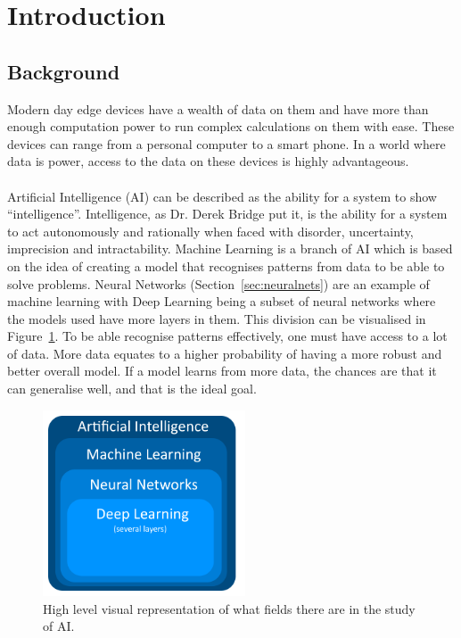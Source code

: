 \documentclass[12pt]{article}
\begin{document}
\listoffigures
{}
\clearpage

\listofalgorithms
{}
\clearpage

\listoftables
{}
\cleardoublepage


\setcounter{page}{1}





\section{Introduction}
\subsection{Background}
Modern day edge devices have a wealth of data on them and have more than enough computation power to run complex calculations on them with ease. These devices can range from a personal computer to a smart phone. In a world where data is power, access to the data on these devices is highly advantageous.
\\\\
Artificial Intelligence (AI) can be described as the ability for a system to show “intelligence”. Intelligence, as Dr. Derek Bridge put it, is the ability for a system to act autonomously and rationally when faced with disorder, uncertainty, imprecision and intractability. Machine Learning is a branch of AI which is based on the idea of creating a model that recognises patterns from data to be able to solve problems. Neural Networks (Section~\ref{sec:neuralnets}) are an example of machine learning with Deep Learning being a subset of neural networks where the models used have more layers in them. This division can be visualised in Figure~\ref{fig:ai}. To be able recognise patterns effectively, one must have access to a lot of data. More data equates to a higher probability of having a more robust and better overall model. If a model learns from more data, the chances are that it can generalise well, and that is the ideal goal. 
\begin{figure}[H]
	\centering
	\includegraphics[width=6cm]{resources/ai.png}
	\caption{High level visual representation of what fields there are in the study of AI.}
	\label{fig:ai}
\end{figure}
\end{document}
